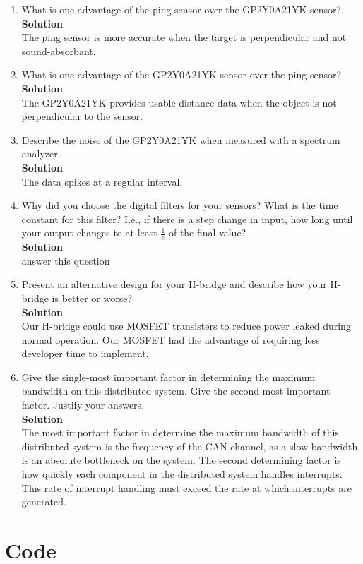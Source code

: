 \documentclass[12pt]{article}
\renewcommand{\Solnlabel}[1]{\textbf{Solution}\quad}
\newcommand{\todo}[1]{{\color{red}{\LARGE TODO} #1}}
\begin{document}
\begin{enumerate}[1)]
\item What is one advantage of the ping sensor over the GP2Y0A21YK
  sensor? \\ \Solnlabel \newline \\
  The ping sensor is more accurate when the target is perpendicular
  and not sound-absorbant.
\item What is one advantage of the GP2Y0A21YK sensor over the ping
  sensor? \\ \Solnlabel \newline \\
  The GP2Y0A21YK provides usable distance data when the object is not
  perpendicular to the sensor.
\item Describe the noise of the GP2Y0A21YK when measured with a
  spectrum analyzer. \\ \Solnlabel \newline \\
  The data spikes at a regular interval.
\item Why did you choose the digital filters for your sensors? What is
  the time constant for this filter? I.e., if there is a step change
  in input, how long until your output changes to at least $\frac{1}{e}$ of the
  final value? \\ \Solnlabel \newline \\
  \todo{answer this question}
\item Present an alternative design for your H-bridge and describe how
  your H-bridge is better or worse? \\ \Solnlabel \newline \\
  Our H-bridge could use MOSFET transisters to reduce power leaked
  during normal operation. Our MOSFET had the advantage of requiring
  less developer time to implement.
\item Give the single-most important factor in determining the maximum
  bandwidth on this distributed system.  Give the second-most
  important factor. Justify your answers. \\ \Solnlabel \newline \\
  The most important factor in determine the maximum bandwidth of this
  distributed system is the frequency of the CAN channel, as a slow
  bandwidth is an absolute bottleneck on the system. The second
  determining factor is how quickly each component in the distributed
  system handles interrupts. This rate of interrupt handling must
  exceed the rate at which interrupts are generated.
\end{enumerate}

\newpage
\section{Code}

\end{document}
